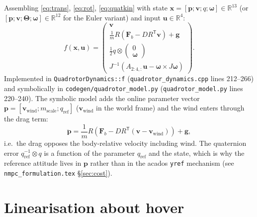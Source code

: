 \documentclass[11pt]{article}
\newcommand{\R}{\mathbb{R}}
\newcommand{\quatmul}{\otimes}
\begin{document}
Assembling \eqref{eq:trans}, \eqref{eq:rot}, \eqref{eq:quatkin} with state
$\bm x = [\bm p; \bm v; q; \bm\omega] \in \R^{13}$ (or $[\bm p; \bm v; \bm\Theta;
\bm\omega] \in \R^{12}$ for the Euler variant) and input $\bm u \in \R^4$:
\begin{equation}
  f(\bm x, \bm u) =
  \begin{pmatrix}
    \bm v \\
    \frac1m R \left( \bm F_b - D R^{\mathsf T} \bm v \right) + \bm g \\
    \frac12 q \quatmul \begin{pmatrix}0\\ \bm\omega\end{pmatrix} \\
    J^{-1} \left( A_{2:4,:} \bm u - \bm\omega \times J \bm\omega \right)
  \end{pmatrix}.
  \label{eq:full}
\end{equation}
Implemented in \texttt{QuadrotorDynamics::f} (\texttt{quadrotor\_dynamics.cpp} lines
212--266) and symbolically in \texttt{codegen/quadrotor\_model.py}
(\texttt{quadrotor\_model.py} lines 220--240). The symbolic model adds the online parameter
vector $\bm p = [\bm v_{\mathrm{wind}}; m_{\mathrm{scale}}; q_{\mathrm{ref}}]$
($\bm v_{\mathrm{wind}}$ in the world frame) and the wind enters through the drag term:
\begin{equation}
  \ddot{\bm p} = \frac1m R \left( \bm F_b - D R^{\mathsf T} (\bm v - \bm v_{\mathrm{wind}})
  \right) + \bm g,
\end{equation}
i.e.\ the drag opposes the body-relative velocity including wind. The quaternion error
$q_{\mathrm{ref}}^{-1} \quatmul q$ is a function of the parameter $q_{\mathrm{ref}}$ and the
state, which is why the reference attitude lives in $\bm p$ rather than in the acados
\texttt{yref} mechanism (see \texttt{nmpc\_formulation.tex} \S\ref{sec:cost}).

\section{Linearisation about hover}
\label{sec:lin}
\end{document}
